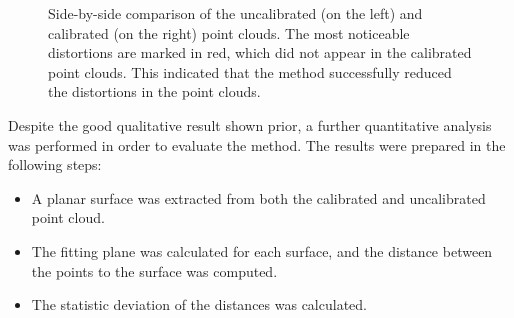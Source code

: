 \documentclass[conference]{IEEEtran}
\begin{document}
\begin{figure}
    \centering
     \qquad

    \caption{Side-by-side comparison of the uncalibrated (on the left) and calibrated (on the right) point clouds. The most noticeable distortions are marked in red, which did not appear in the calibrated point clouds. This indicated that the method successfully reduced the distortions in the point clouds.}
    \label{figure:visual-comparison}
\end{figure}

Despite the good qualitative result shown prior, a further quantitative analysis was performed in order to evaluate the method. The results were prepared in the following steps:

\begin{itemize}
    \item A planar surface was extracted from both the calibrated and uncalibrated point cloud.
    \item The fitting plane was calculated for each surface, and the distance between the points to the surface was computed.
    \item The statistic deviation of the distances was calculated.
\end{itemize}
\end{document}
